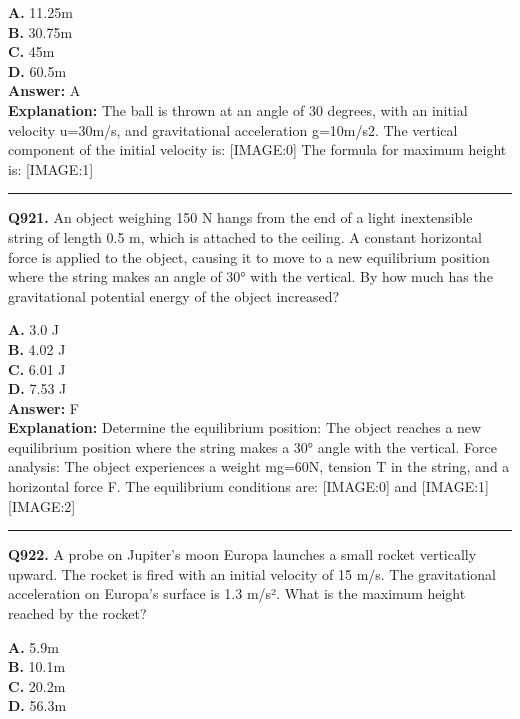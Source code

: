 \documentclass[12pt]{article}
\begin{document}
\textbf{A.} 11.25m \\
\textbf{B.} 30.75m \\
\textbf{C.} 45m \\
\textbf{D.} 60.5m \\

\textbf{Answer:} A \\
\textbf{Explanation:} The ball is thrown at an angle of 30 degrees, with an initial velocity u=30m/s, and gravitational acceleration g=10m/s2.
The vertical component of the initial velocity is:
[IMAGE:0]
The formula for maximum height is:
[IMAGE:1]

\hrule
\vspace{1em}


\noindent
\textbf{Q921.} An object weighing 150 N hangs from the end of a light inextensible string of length 0.5 m, which is attached to the ceiling. A constant horizontal force is applied to the object, causing it to move to a new equilibrium position where the string makes an angle of 30° with the vertical. By how much has the gravitational potential energy of the object increased?



\textbf{A.} 3.0 J \\
\textbf{B.} 4.02 J \\
\textbf{C.} 6.01 J \\
\textbf{D.} 7.53 J \\

\textbf{Answer:} F \\
\textbf{Explanation:} Determine the equilibrium position: The object reaches a new equilibrium position where the string makes a 30° angle with the vertical.
Force analysis: The object experiences a weight mg=60N, tension T in the string, and a horizontal force F. The equilibrium conditions are:
[IMAGE:0]
and
[IMAGE:1]
[IMAGE:2]

\hrule
\vspace{1em}


\noindent
\textbf{Q922.} A probe on Jupiter's moon Europa launches a small rocket vertically upward. The rocket is fired with an initial velocity of 15 m/s. The gravitational acceleration on Europa's surface is 1.3 m/s². What is the maximum height reached by the rocket?



\textbf{A.} 5.9m \\
\textbf{B.} 10.1m \\
\textbf{C.} 20.2m \\
\textbf{D.} 56.3m \\
\end{document}
